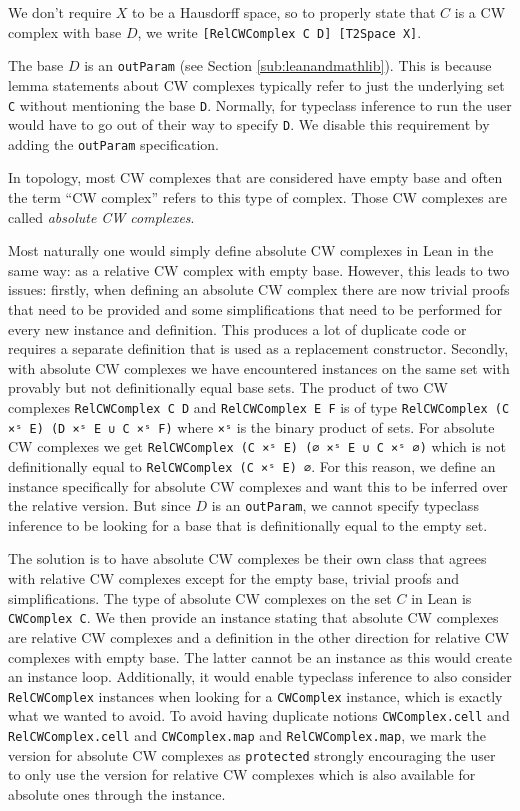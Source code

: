 We don't require $X$ to be a Hausdorff space, so to properly state that $C$ is a CW complex with base $D$, we write \lstinline|[RelCWComplex C D] [T2Space X]|.

The base $D$ is an \lstinline|outParam| (see Section \ref{sub:leanandmathlib}). 
This is because lemma statements about CW complexes typically refer to just the underlying set \lstinline|C| without mentioning the base \lstinline|D|. 
Normally, for typeclass inference to run the user would have to go out of their way to specify \lstinline|D|. 
We disable this requirement by adding the \lstinline|outParam| specification.

In topology, most CW complexes that are considered have empty base and often the term ``CW complex'' refers to this type of complex. 
Those CW complexes are called \emph{absolute CW complexes}. 

Most naturally one would simply define absolute CW complexes in Lean in the same way: as a relative CW complex with empty base.
However, this leads to two issues: 
firstly, when defining an absolute CW complex there are now trivial proofs that need to be provided and some simplifications that need to be performed for every new instance and definition. 
This produces a lot of duplicate code or requires a separate definition that is used as a replacement constructor. 
Secondly, with absolute CW complexes we have encountered instances on the same set with provably but not definitionally equal base sets. 
The product of two CW complexes \lstinline|RelCWComplex C D| and \lstinline|RelCWComplex E F| is of type \lstinline|RelCWComplex (C ×ˢ E) (D ×ˢ E ∪ C ×ˢ F)| where \lstinline|×ˢ| is the binary product of sets. 
For absolute CW complexes we get \lstinline|RelCWComplex (C ×ˢ E) (∅ ×ˢ E ∪ C ×ˢ ∅)| which is not definitionally equal to \lstinline|RelCWComplex (C ×ˢ E) ∅|.
For this reason, we define an instance specifically for absolute CW complexes and want this to be inferred over the relative version. 
But since $D$ is an \lstinline|outParam|, we cannot specify typeclass inference to be looking for a base that is definitionally equal to the empty set. 

The solution is to have absolute CW complexes be their own class that agrees with relative CW complexes except for the empty base, trivial proofs and simplifications. 
The type of absolute CW complexes on the set $C$ in Lean is \lstinline|CWComplex C|. 
We then provide an instance stating that absolute CW complexes are relative CW complexes and a definition in the other direction for relative CW complexes with empty base.
The latter cannot be an instance as this would create an instance loop.
Additionally, it would enable typeclass inference to also consider \lstinline|RelCWComplex| instances when looking for a \lstinline|CWComplex| instance, which is exactly what we wanted to avoid.
To avoid having duplicate notions \lstinline|CWComplex.cell| and \lstinline|RelCWComplex.cell| and \lstinline|CWComplex.map| and \lstinline|RelCWComplex.map|, we mark the version for absolute CW complexes as \lstinline|protected| strongly encouraging the user to only use the version for relative CW complexes which is also available for absolute ones through the instance.

